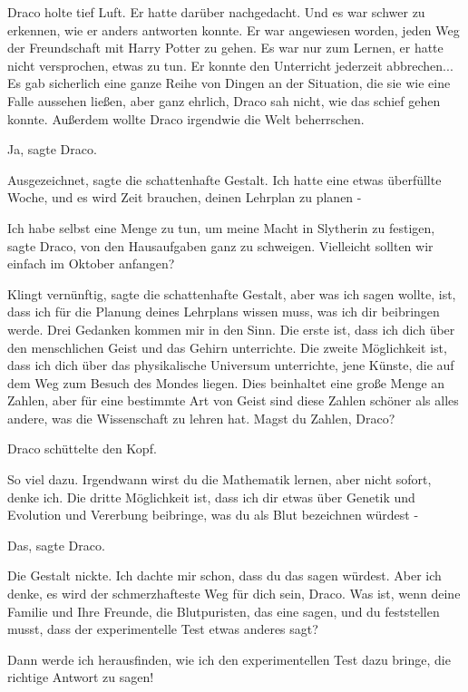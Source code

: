 Draco holte tief Luft. Er hatte darüber nachgedacht. Und es war schwer zu
erkennen, wie er anders antworten konnte. Er war angewiesen worden, jeden Weg
der Freundschaft mit Harry Potter zu gehen. Es war nur zum Lernen, er hatte
nicht versprochen, etwas zu tun. Er konnte den Unterricht jederzeit abbrechen...
Es gab sicherlich eine ganze Reihe von Dingen an der Situation, die sie wie eine
Falle aussehen ließen, aber ganz ehrlich, Draco sah nicht, wie das schief gehen
konnte. Außerdem wollte Draco irgendwie die Welt beherrschen.

\glqq Ja\grqq{}, sagte Draco.

\glqq Ausgezeichnet\grqq{}, sagte die schattenhafte Gestalt. \glqq Ich hatte
eine etwas überfüllte Woche, und es wird Zeit brauchen, deinen Lehrplan zu
planen -\grqq{}

\glqq Ich habe selbst eine Menge zu tun, um meine Macht in Slytherin zu
festigen\grqq{}, sagte Draco, \glqq von den Hausaufgaben ganz zu schweigen.
Vielleicht sollten wir einfach im Oktober anfangen?\grqq{}

\glqq Klingt vernünftig\grqq{}, sagte die schattenhafte Gestalt, \glqq aber was
ich sagen wollte, ist, dass ich für die Planung deines Lehrplans wissen muss,
was ich dir beibringen werde. Drei Gedanken kommen mir in den Sinn. Die erste
ist, dass ich dich über den menschlichen Geist und das Gehirn unterrichte. Die
zweite Möglichkeit ist, dass ich dich über das physikalische Universum
unterrichte, jene Künste, die auf dem Weg zum Besuch des Mondes liegen. Dies
beinhaltet eine große Menge an Zahlen, aber für eine bestimmte Art von Geist
sind diese Zahlen schöner als alles andere, was die Wissenschaft zu lehren hat.
Magst du Zahlen, Draco?\grqq{}

Draco schüttelte den Kopf.

\glqq So viel dazu. Irgendwann wirst du die Mathematik lernen, aber nicht
sofort, denke ich. Die dritte Möglichkeit ist, dass ich dir etwas über Genetik
und Evolution und Vererbung beibringe, was du als Blut bezeichnen würdest
-\grqq{}

\glqq Das\grqq{}, sagte Draco.

Die Gestalt nickte. \glqq Ich dachte mir schon, dass du das sagen würdest. Aber
ich denke, es wird der schmerzhafteste Weg für dich sein, Draco. Was ist, wenn
deine Familie und Ihre Freunde, die Blutpuristen, das eine sagen, und du
feststellen musst, dass der experimentelle Test etwas anderes sagt?\grqq{}

\glqq Dann werde ich herausfinden, wie ich den experimentellen Test dazu bringe,
die richtige Antwort zu sagen!\grqq{}

